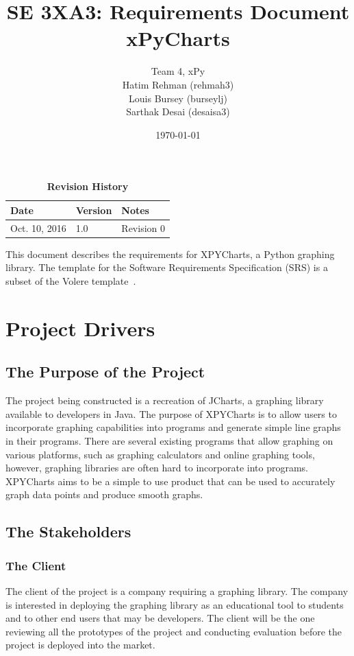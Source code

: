 \documentclass[12pt, titlepage]{article}
\title{SE 3XA3: Requirements Document\\xPyCharts}
\author{Team 4, xPy
		\\ Hatim Rehman (rehmah3)
		\\ Louis Bursey (burseylj)
		\\ Sarthak Desai (desaisa3)
}
\date{\today}
\begin{document}
\maketitle

\tableofcontents
\listoftables
\listoffigures

\begin{table}[bp]
\caption{\bf Revision History}
\begin{tabularx}{\textwidth}{p{3cm}p{2cm}X}
\toprule {\bf Date} & {\bf Version} & {\bf Notes}\\
\midrule
Oct. 10, 2016 & 1.0 & Revision 0\\
\bottomrule
\end{tabularx}
\end{table}

\newpage


This document describes the requirements for XPYCharts, a Python graphing library.  The template for the Software
Requirements Specification (SRS) is a subset of the Volere
template~\citep{RobertsonAndRobertson2012}.  

\section{Project Drivers}

\subsection{The Purpose of the Project}
The project being constructed is a recreation of JCharts, a graphing library available to developers in Java. The purpose of XPYCharts is to allow users to incorporate graphing capabilities into programs and generate simple line graphs in their programs. There are several existing programs that allow graphing on various platforms, such as graphing calculators and online graphing tools, however, graphing libraries are often hard to incorporate into programs. XPYCharts aims to be a simple to use product that can be used to accurately graph data points and produce smooth graphs.

\subsection{The Stakeholders}

\subsubsection{The Client}
The client of the project is a company requiring a graphing library. The company is interested in deploying the graphing library as an educational tool to students and to other end users that may be developers. The client will be the one reviewing all the prototypes of the project and conducting evaluation before the project is deployed into the market.
\end{document}
